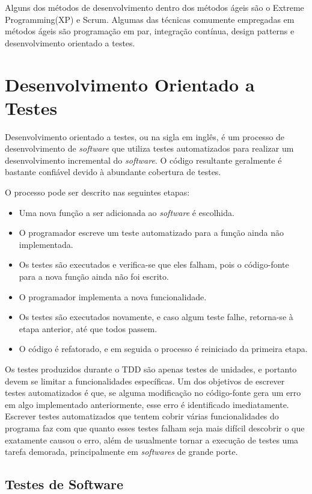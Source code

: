Alguns dos métodos de desenvolvimento dentro dos métodos ágeis são o Extreme Programming(XP) e Scrum. Algumas das técnicas comumente empregadas em métodos ágeis são programação em par, integração contínua, design patterns e desenvolvimento orientado a testes.

\section{Desenvolvimento Orientado a Testes}\label{fun:tdd}

Desenvolvimento orientado a testes, ou  na sigla em inglês, é um processo de desenvolvimento de \emph{software} que utiliza testes automatizados para realizar um desenvolvimento incremental do \emph{software}. O código resultante geralmente é bastante confiável devido à abundante cobertura de testes.

O processo pode ser descrito nas seguintes etapas:
\begin{itemize}
\item Uma nova função a ser adicionada ao \emph{software} é escolhida.
\item O programador escreve um teste automatizado para a função ainda não implementada.
\item Os testes são executados e verifica-se que eles falham, pois o código-fonte para a nova função ainda não foi escrito.
\item O programador implementa a nova funcionalidade.
\item Os testes são executados novamente, e caso algum teste falhe, retorna-se à etapa anterior, até que todos passem.
\item O código é refatorado, e em seguida o processo é reiniciado da primeira etapa.
\end{itemize}

Os testes produzidos durante o TDD são apenas testes de unidades, e portanto devem se limitar a funcionalidades específicas. Um dos objetivos de escrever testes automatizados é que, se alguma modificação no código-fonte gera um erro em algo implementado anteriormente, esse erro é identificado imediatamente. Escrever testes automatizados que tentem cobrir várias funcionalidades do programa faz com que quanto esses testes falham seja mais difícil descobrir o que exatamente causou o erro, além de usualmente tornar a execução de testes uma tarefa demorada, principalmente em \emph{softwares} de grande porte.

\subsection{Testes de Software}

